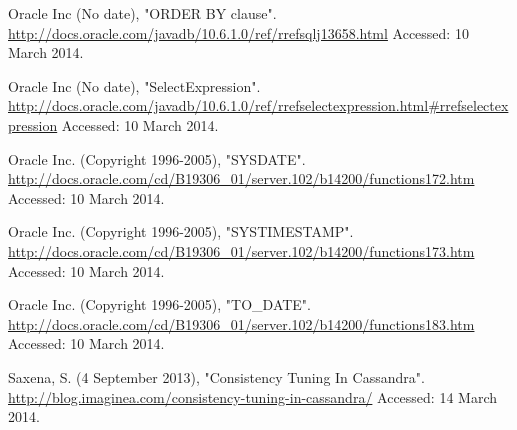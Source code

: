 \documentclass[letterpaper]{article}
\begin{document}
Oracle Inc (No date), "ORDER BY clause".
\url{http://docs.oracle.com/javadb/10.6.1.0/ref/rrefsqlj13658.html}
Accessed: 10 March 2014.

Oracle Inc (No date), "SelectExpression".
\url{http://docs.oracle.com/javadb/10.6.1.0/ref/rrefselectexpression.html#rrefselectexpression}
Accessed: 10 March 2014.

Oracle Inc. (Copyright 1996-2005), "SYSDATE".
\url{http://docs.oracle.com/cd/B19306_01/server.102/b14200/functions172.htm}
Accessed: 10 March 2014.

Oracle Inc. (Copyright 1996-2005), "SYSTIMESTAMP".
\url{http://docs.oracle.com/cd/B19306_01/server.102/b14200/functions173.htm}
Accessed: 10 March 2014.

Oracle Inc. (Copyright 1996-2005), "TO\_DATE".
\url{http://docs.oracle.com/cd/B19306_01/server.102/b14200/functions183.htm}
Accessed: 10 March 2014.

Saxena, S. (4 September 2013), "Consistency Tuning In Cassandra".
\url{http://blog.imaginea.com/consistency-tuning-in-cassandra/}
Accessed: 14 March 2014.
\end{document}
